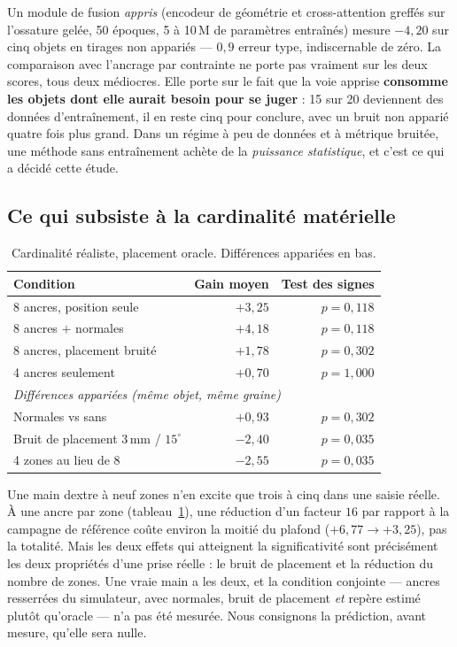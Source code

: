\documentclass[conference]{IEEEtran}
\newcommand{\gd}[1]{\textbf{#1}}
\newcommand{\lo}[1]{\textbf{#1}}
\begin{document}
Un module de fusion \emph{appris} (encodeur de géométrie et cross-attention greffés
sur l'ossature gelée, 50 époques, 5 à 10\,M de paramètres entraînés) mesure $-4{,}20$
sur cinq objets en tirages non appariés --- $0{,}9$ erreur type, indiscernable de
zéro. La comparaison avec l'ancrage par contrainte ne porte pas vraiment sur les deux
scores, tous deux médiocres. Elle porte sur le fait que la voie apprise
\textbf{consomme les objets dont elle aurait besoin pour se juger} : 15 sur 20
deviennent des données d'entraînement, il en reste cinq pour conclure, avec un bruit
non apparié quatre fois plus grand. Dans un régime à peu de données et à métrique
bruitée, une méthode sans entraînement achète de la \emph{puissance statistique}, et
c'est ce qui a décidé cette étude.

\subsection{Ce qui subsiste à la cardinalité matérielle}
\label{sec:res-hand}

\begin{table}[t]
\centering
\caption{Cardinalité réaliste, placement oracle. Différences appariées en bas.}
\label{tab:hand}
\begin{tabular}{lrr}
\toprule
Condition & Gain moyen & Test des signes \\
\midrule
8 ancres, position seule & $+3{,}25$ & $p=0{,}118$ \\
8 ancres $+$ normales & $+4{,}18$ & $p=0{,}118$ \\
8 ancres, placement bruité & $+1{,}78$ & $p=0{,}302$ \\
4 ancres seulement & $+0{,}70$ & $p=1{,}000$ \\
\midrule
\multicolumn{3}{l}{\emph{Différences appariées (même objet, même graine)}}\\
Normales vs sans & $+0{,}93$ & $p = 0{,}302$ \\
Bruit de placement 3\,mm / $15^\circ$ & \lo{$-2{,}40$} & \gd{$p = 0{,}035$} \\
4 zones au lieu de 8 & \lo{$-2{,}55$} & \gd{$p = 0{,}035$} \\
\bottomrule
\end{tabular}
\end{table}

Une main dextre à neuf zones n'en excite que trois à cinq dans une saisie réelle. À
une ancre par zone (tableau~\ref{tab:hand}), une réduction d'un facteur $16$ par
rapport à la campagne de référence coûte environ la moitié du plafond ($+6{,}77
\rightarrow +3{,}25$), pas la totalité. Mais les deux effets qui atteignent la
significativité sont précisément les deux propriétés d'une prise réelle : le bruit de
placement et la réduction du nombre de zones. Une vraie main a les deux, et la
condition conjointe --- ancres resserrées du simulateur, avec normales, bruit de
placement \emph{et} repère estimé plutôt qu'oracle --- n'a pas été mesurée. Nous
consignons la prédiction, avant mesure, qu'elle sera nulle.
\end{document}
